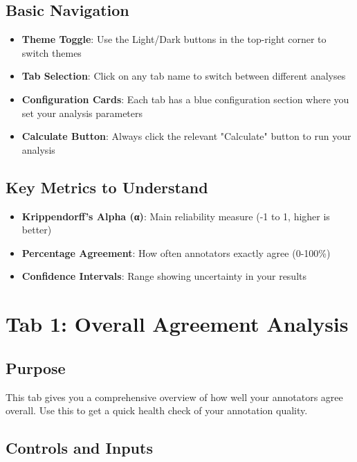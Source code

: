 \documentclass[11pt]{article}
\begin{document}
\subsection{Basic Navigation}
\begin{itemize}
\item \textbf{Theme Toggle}: Use the Light/Dark buttons in the top-right corner to switch themes
\item \textbf{Tab Selection}: Click on any tab name to switch between different analyses
\item \textbf{Configuration Cards}: Each tab has a blue configuration section where you set your analysis parameters
\item \textbf{Calculate Button}: Always click the relevant "Calculate" button to run your analysis
\end{itemize}

\subsection{Key Metrics to Understand}
\begin{itemize}
\item \textbf{Krippendorff's Alpha (α)}: Main reliability measure (-1 to 1, higher is better)
\item \textbf{Percentage Agreement}: How often annotators exactly agree (0-100\%)
\item \textbf{Confidence Intervals}: Range showing uncertainty in your results
\end{itemize}

\section{Tab 1: Overall Agreement Analysis}

\subsection{Purpose}
This tab gives you a comprehensive overview of how well your annotators agree overall. Use this to get a quick health check of your annotation quality.

\subsection{Controls and Inputs}
\end{document}
